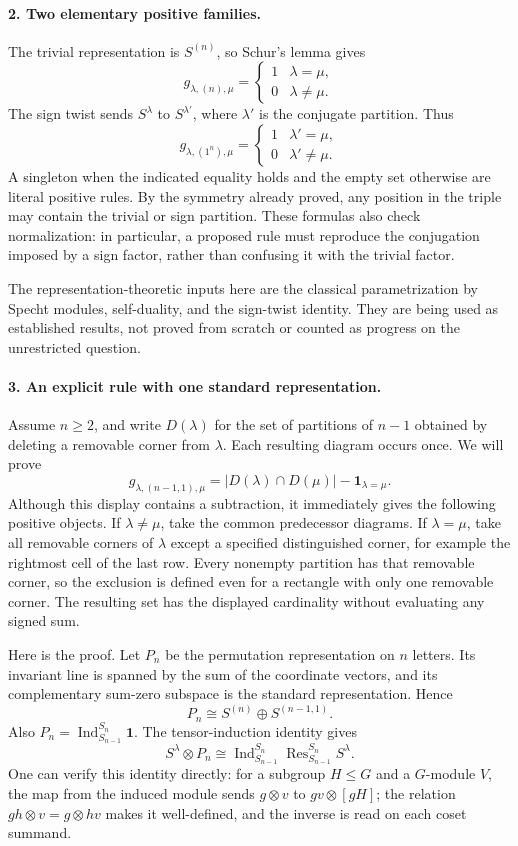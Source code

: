 \documentclass[11pt]{article}
\begin{document}
\paragraph{2. Two elementary positive families.}
The trivial representation is $S^{(n)}$, so Schur's lemma gives
\[
 g_{\lambda,(n),\mu}=\begin{cases}1&\lambda=\mu,\\0&\lambda\ne\mu.\end{cases}
\]
The sign twist sends $S^\lambda$ to $S^{\lambda'}$, where $\lambda'$ is the conjugate partition. Thus
\[
 g_{\lambda,(1^n),\mu}=\begin{cases}1&\lambda'=\mu,\\0&\lambda'\ne\mu.\end{cases}
\]
A singleton when the indicated equality holds and the empty set otherwise are literal positive rules. By the symmetry already proved, any position in the triple may contain the trivial or sign partition. These formulas also check normalization: in particular, a proposed rule must reproduce the conjugation imposed by a sign factor, rather than confusing it with the trivial factor.

The representation-theoretic inputs here are the classical parametrization by Specht modules, self-duality, and the sign-twist identity. They are being used as established results, not proved from scratch or counted as progress on the unrestricted question.

\paragraph{3. An explicit rule with one standard representation.}
Assume $n\ge2$, and write $D(\lambda)$ for the set of partitions of $n-1$ obtained by deleting a removable corner from $\lambda$. Each resulting diagram occurs once. We will prove
\[
 g_{\lambda,(n-1,1),\mu}
 =|D(\lambda)\cap D(\mu)|-\mathbf 1_{\lambda=\mu}.
\]
Although this display contains a subtraction, it immediately gives the following positive objects. If $\lambda\ne\mu$, take the common predecessor diagrams. If $\lambda=\mu$, take all removable corners of $\lambda$ except a specified distinguished corner, for example the rightmost cell of the last row. Every nonempty partition has that removable corner, so the exclusion is defined even for a rectangle with only one removable corner. The resulting set has the displayed cardinality without evaluating any signed sum.

Here is the proof. Let $P_n$ be the permutation representation on $n$ letters. Its invariant line is spanned by the sum of the coordinate vectors, and its complementary sum-zero subspace is the standard representation. Hence
\[
 P_n\cong S^{(n)}\oplus S^{(n-1,1)}.
\]
Also $P_n=\operatorname{Ind}_{S_{n-1}}^{S_n}\mathbf1$. The tensor-induction identity gives
\[
 S^\lambda\otimes P_n
 \cong\operatorname{Ind}_{S_{n-1}}^{S_n}
             \operatorname{Res}_{S_{n-1}}^{S_n}S^\lambda.
\]
One can verify this identity directly: for a subgroup $H\le G$ and a $G$-module $V$, the map from the induced module sends $g\otimes v$ to $gv\otimes[gH]$; the relation $gh\otimes v=g\otimes hv$ makes it well-defined, and the inverse is read on each coset summand.
\end{document}
